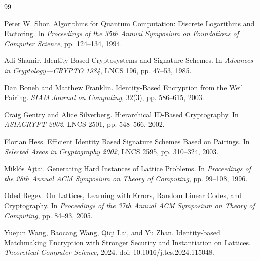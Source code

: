 \documentclass[UTF8,a4paper,12pt,oneside,openany,fontset=fandol]{ctexrep}
\newcommand{\reportheader}{全国密码技术竞赛作品设计报告}
\renewcommand{\headrulewidth}{0pt}
\renewcommand{\footrulewidth}{0pt}
\renewcommand{\headrulewidth}{0.4pt}
\renewcommand{\footrulewidth}{0pt}
\begin{document}
\clearpage
\hypersetup{pageanchor=true}
\pagestyle{frontmatter}
\begingroup
\linespread{1.15}\selectfont
\tableofcontents
\clearpage
\endgroup
{}
\fancypagestyle{plain}{
  \fancyhf{}
  \fancyhead[C]{\small\songti\reportheader}
  \fancyfoot[C]{\small\thepage}
  \renewcommand{\headrulewidth}{0.4pt}
  \renewcommand{\footrulewidth}{0pt}
}
\pagestyle{mainmatter}











\clearpage
{}
\begin{thebibliography}{99}
\small

Peter W. Shor.
Algorithms for Quantum Computation: Discrete Logarithms and Factoring.
In \emph{Proceedings of the 35th Annual Symposium on Foundations of Computer Science},
pp. 124--134, 1994.

Adi Shamir.
Identity-Based Cryptosystems and Signature Schemes.
In \emph{Advances in Cryptology---CRYPTO 1984}, LNCS 196, pp. 47--53, 1985.

Dan Boneh and Matthew Franklin.
Identity-Based Encryption from the Weil Pairing.
\emph{SIAM Journal on Computing}, 32(3), pp. 586--615, 2003.

Craig Gentry and Alice Silverberg.
Hierarchical ID-Based Cryptography.
In \emph{ASIACRYPT 2002}, LNCS 2501, pp. 548--566, 2002.

Florian Hess.
Efficient Identity Based Signature Schemes Based on Pairings.
In \emph{Selected Areas in Cryptography 2002}, LNCS 2595, pp. 310--324, 2003.

Miklós Ajtai.
Generating Hard Instances of Lattice Problems.
In \emph{Proceedings of the 28th Annual ACM Symposium on Theory of Computing},
pp. 99--108, 1996.

Oded Regev.
On Lattices, Learning with Errors, Random Linear Codes, and Cryptography.
In \emph{Proceedings of the 37th Annual ACM Symposium on Theory of Computing},
pp. 84--93, 2005.

Yuejun Wang, Baocang Wang, Qiqi Lai, and Yu Zhan.
Identity-based Matchmaking Encryption with Stronger Security and Instantiation on Lattices.
\emph{Theoretical Computer Science}, 2024.
doi: 10.1016/j.tcs.2024.115048.


\end{thebibliography}
\end{document}
